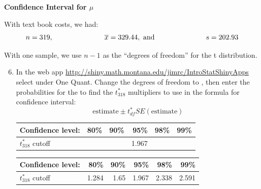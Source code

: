 \begin{center}
  {\large\bf Confidence Interval for $\mu$}
\end{center}

With text book costs, we had:
$$ n = 319, \mbox{\hspace{1in}} \overline{x} = 329.44, \mbox{ and\hspace{1in}}  s = 202.93 $$

With one sample, we use $n-1$ as the ``degrees of freedom'' for the t
distribution.  
\begin{enumerate}
  \setcounter{enumi}{5}
\item In the web app
  \url{http://shiny.math.montana.edu/jimrc/IntroStatShinyApps} select
   under {One Quant}. Change the degrees of
  freedom to , then enter the probabilities for the
   to find the $t^*_{318}$ multipliers to use in the
  formula for confidence interval:
     $$  \mbox{estimate} \pm t^*_{df} SE(\mbox{estimate}) $$
\begin{students}
   \begin{tabular}{l|rrrrr}
    Confidence level: &  \hspace{1cm}80\% &  \hspace{1cm}90\% &  \hspace{1cm}95\% & \hspace{1cm} 98\% & \hspace{1cm} 99\% \\ \hline
    $t_{318}^*$ cutoff  &  &  & 1.967 &  & 
  \end{tabular}\vspace{.2cm}
\end{students}
\begin{key}
   \begin{tabular}{l|rrrrr}
    Confidence level: &  \hspace{1cm}80\% &  \hspace{1cm}90\% &  \hspace{1cm}95\% & \hspace{1cm} 98\% & \hspace{1cm} 99\% \\ \hline
    $t_{318}^*$ cutoff  &1.284  &1.65  & 1.967 &2.338& 2.591
  \end{tabular}\vspace{.2cm}
\end{key}


\end{enumerate}
